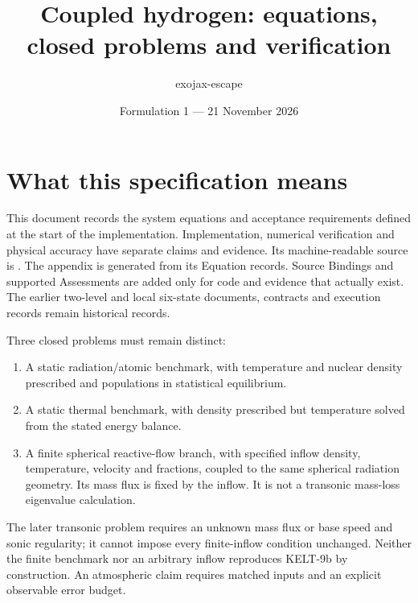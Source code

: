 \documentclass[11pt,a4paper]{article}
\title{Coupled hydrogen: equations, closed problems and verification}
\author{exojax-escape}
\date{Formulation 1 --- 21 November 2026}
\begin{document}
\maketitle

\section{What this specification means}
This document records the system equations and acceptance requirements defined
at the start of the implementation. Implementation, numerical verification and
physical accuracy have separate claims and evidence.
Its machine-readable source is
. The appendix is generated
from its Equation records. Source Bindings and supported Assessments are added
only for code and evidence that actually exist. The earlier two-level and local
six-state documents, contracts and execution records remain historical records.

Three closed problems must remain distinct:
\begin{enumerate}
\item A static radiation/atomic benchmark, with temperature and nuclear density
prescribed and populations in statistical equilibrium.
\item A static thermal benchmark, with density prescribed but temperature
solved from the stated energy balance.
\item A finite spherical reactive-flow branch, with specified inflow density,
temperature, velocity and fractions, coupled to the same spherical radiation
geometry. Its mass flux is fixed by the inflow. It is not a transonic
mass-loss eigenvalue calculation.
\end{enumerate}
The later transonic problem requires an unknown mass flux or base speed and
sonic regularity; it cannot impose every finite-inflow condition unchanged.
Neither the finite benchmark nor an arbitrary inflow reproduces KELT-9b by
construction. An atmospheric claim requires matched inputs and an explicit
observable error budget.
\end{document}
